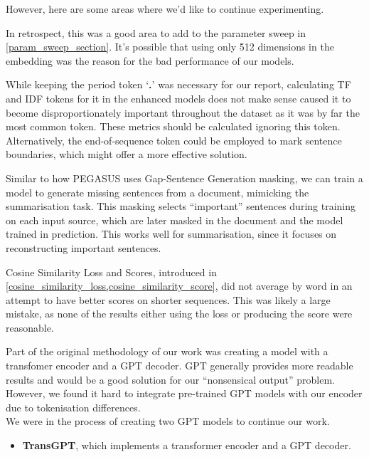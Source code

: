 However, here are some areas where we'd like to continue experimenting.
\begin{description}[style=nextline,noitemsep]
	\item[Embedding Size]
		In retrospect, this was a good area to add to the parameter sweep in \cref{param_sweep_section}.
		It's possible that using only 512 dimensions in the embedding was the reason for the bad performance of our models.
	\item[TF and IDF tokens in the period token]
		While keeping the period token `\textbf{.}' was necessary for our report, calculating TF and IDF tokens for it in the enhanced models does not make sense caused it to become disproportionately important throughout the dataset as it was by far the most common token.
		These metrics should be calculated ignoring this token.
		Alternatively, the end-of-sequence token could be employed to mark sentence boundaries, which might offer a more effective solution.
	\item[Novel uses of masking]
		Similar to how PEGASUS uses Gap-Sentence Generation masking\cite{pegasus_model}, we can train a model to generate missing sentences from a document, mimicking the summarisation task.
		This masking selects ``important'' sentences during training on each input source, which are later masked in the document and the model trained in prediction.
		This works well for summarisation, since it focuses on reconstructing important sentences.
	\item[Non-novel uses of cosine similarity score and loss]
		Cosine Similarity Loss and Scores, introduced in \cref{cosine_similarity_loss,cosine_similarity_score}, did not average by word in an attempt to have better scores on shorter sequences.
		This was likely a large mistake, as none of the results either using the loss or producing the score were reasonable.
	\item[Using a GPT decoder]
		Part of the original methodology of our work was creating a model with a transfomer encoder and a GPT decoder.
		GPT generally provides more readable results and would be a good solution for our ``nonsensical output'' problem.
		However, we found it hard to integrate pre-trained GPT models with our encoder due to tokenisation differences. \\
		We were in the process of creating two GPT models to continue our work.
		\begin{itemize}
			\item \textbf{TransGPT}, which implements a transformer encoder and a GPT decoder.

\end{itemize}
\end{description}
